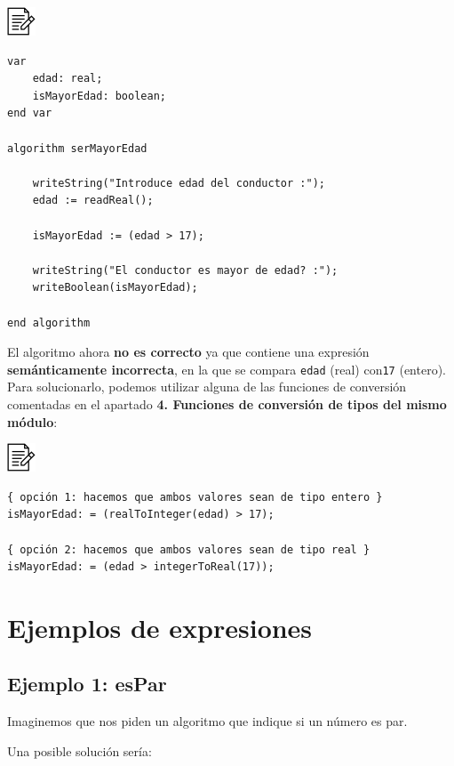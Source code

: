 \documentclass[
]{book}
\begin{document}
\includegraphics{./img/alg.png}

\begin{verbatim}
var
    edad: real;
    isMayorEdad: boolean;
end var

algorithm serMayorEdad

    writeString("Introduce edad del conductor :");
    edad := readReal();

    isMayorEdad := (edad > 17);

    writeString("El conductor es mayor de edad? :");
    writeBoolean(isMayorEdad);

end algorithm
\end{verbatim}

El algoritmo ahora \textbf{no es correcto} ya que contiene una expresión \textbf{semánticamente incorrecta}, en la que se compara \texttt{edad} (real) con\texttt{17} (entero). Para solucionarlo, podemos utilizar alguna de las funciones de conversión comentadas en el apartado \textbf{4. Funciones de conversión de tipos del mismo módulo}:

\includegraphics{./img/alg.png}

\begin{verbatim}
{ opción 1: hacemos que ambos valores sean de tipo entero }
isMayorEdad: = (realToInteger(edad) > 17);

{ opción 2: hacemos que ambos valores sean de tipo real }
isMayorEdad: = (edad > integerToReal(17));
\end{verbatim}

\hypertarget{ejemplos-de-expresiones}{%
\section{Ejemplos de expresiones}\label{ejemplos-de-expresiones}}

\hypertarget{ejemplo-1-espar}{%
\subsection{Ejemplo 1: esPar}\label{ejemplo-1-espar}}

Imaginemos que nos piden un algoritmo que indique si un número es par.

Una posible solución sería:
\end{document}
